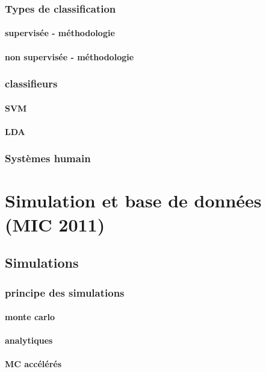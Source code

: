 \documentclass[12pt]{book}
\begin{document}
		\section{Types de classification}
			\subsection{supervisée - méthodologie}
			\subsection{non supervisée - méthodologie}
		\section{classifieurs}
			\subsection{SVM}
			\subsection{LDA}
		\section{Systèmes humain}


\part{Simulation et base de données (MIC 2011)}
	\chapter{Simulations}
		\section{principe des simulations}
			\subsection{monte carlo}
			\subsection{analytiques}
			\subsection{MC accélérés}
\end{document}
